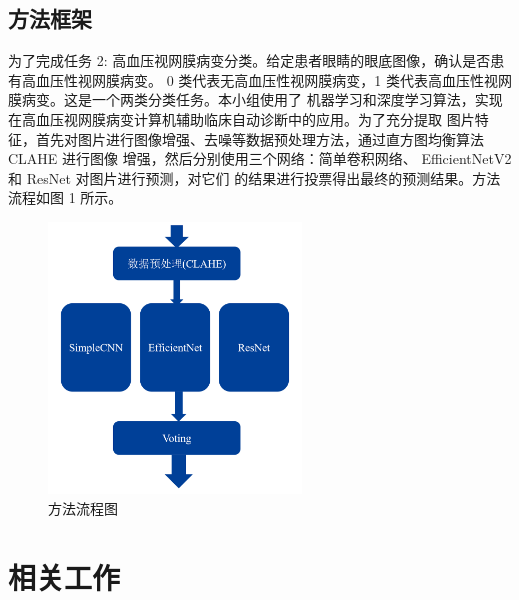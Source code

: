 \documentclass[UTF8,12pt,a4paper]{ctexart}
\begin{document}
\subsection{方法框架}
为了完成任务 2: 高血压视网膜病变分类。给定患者眼睛的眼底图像，确认是否患有高血压性视网膜病变。
0 类代表无高血压性视网膜病变，1 类代表高血压性视网膜病变。这是一个两类分类任务。本小组使用了
机器学习和深度学习算法，实现在高血压视网膜病变计算机辅助临床自动诊断中的应用。为了充分提取
图片特征，首先对图片进行图像增强、去噪等数据预处理方法，通过直方图均衡算法 CLAHE 进行图像
增强，然后分别使用三个网络：简单卷积网络、 EfficientNetV2 和 ResNet 对图片进行预测，对它们
的结果进行投票得出最终的预测结果。方法流程如图 1 所示。
\begin{figure}[H]
	\centering
	\includegraphics[width=0.6\textwidth]{picture/procedure.png}
	\caption{方法流程图}
\end{figure}


\section{相关工作}
\end{document}
